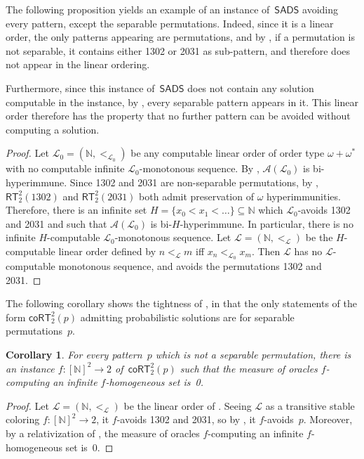 \documentclass{article}
\numberwithin{theorem}{section}
\newtheorem{proposition}[theorem]{Proposition}
\newtheorem{corollary}[theorem]{Corollary}
\def\L{\mathcal{L}}
\def\A{\mathcal{A}}
\newcommand{\RT}[0]{\mathsf{RT}}
\newcommand{\SADS}{\mathsf{SADS}}
\newcommand{\coRT}[0]{\mathsf{coRT}}
\newcommand{\NN}[0]{\mathbb{N}}
\begin{document}
The following proposition yields an example of an instance of~$\SADS$ avoiding every pattern, except the separable permutations. Indeed, since it is a linear order, the only patterns appearing are permutations, and by , if a permutation is not separable, it contains either 1302 or 2031 as sub-pattern, and therefore does not appear in the linear ordering.

Furthermore, since this instance of~$\SADS$ does not contain any solution computable in the instance, by , every separable pattern appears in it. This linear order therefore has the property that no further pattern can be avoided without computing a solution.

\begin{proof}
Let $\L_0 = (\NN, <_{\L_0})$ be any computable linear order of order type $\omega+\omega^{*}$ with no computable infinite $\L_0$-monotonous sequence. By , $\A(\L_0)$ is bi-hyperimmune.
Since 1302 and 2031 are non-separable permutations, by , $\RT^2_2(1302)$ and $\RT^2_2(2031)$ both admit preservation of $\omega$ hyperimmunities. Therefore, there is an infinite set $H = \{ x_0 < x_1 < \dots \} \subseteq \NN$ which $\L_0$-avoids 1302 and 2031 and such that $\A(\L_0)$ is bi-$H$-hyperimmune. In particular, there is no infinite $H$-computable $\L_0$-monotonous sequence.
Let $\L = (\NN, <_\L)$ be the $H$-computable linear order defined by $n <_\L m$ iff $x_n <_{\L_0} x_m$.
Then $\L$ has no $\L$-computable monotonous sequence, and avoids the permutations 1302 and 2031.
\end{proof}

The following corollary shows the tightness of , in that the only statements of the form $\coRT^2_2(p)$ admitting probabilistic solutions are for separable permutations~$p$.

\begin{corollary}
For every pattern~$p$ which is not a separable permutation, there is an instance $f : [\NN]^2 \to 2$ of~$\coRT^2_2(p)$ such that the measure of oracles $f$-computing an infinite $f$-homogeneous set is~0.
\end{corollary}
\begin{proof}
Let $\L = (\NN, <_\L)$ be the linear order of .
Seeing $\L$ as a transitive stable coloring $f : [\NN]^2 \to 2$, it $f$-avoids 1302 and 2031,
so by , it $f$-avoids~$p$. Moreover, by a relativization of , the measure of oracles $f$-computing an infinite $f$-homogeneous set is~0.
\end{proof}
\end{document}
